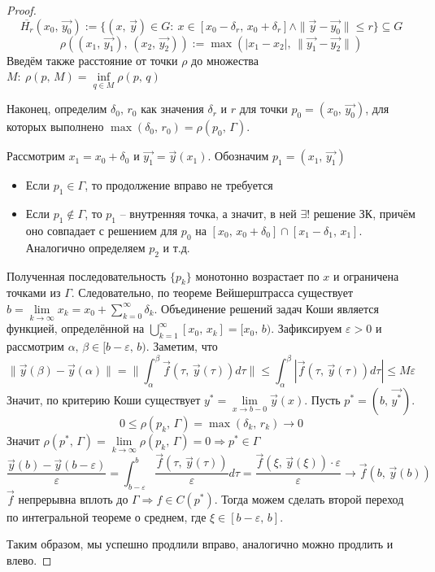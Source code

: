 \documentclass[a4paper,12pt]{article}
\renewcommand{\leq}{\ensuremath{\leqslant}}
\theoremstyle{plain}
\theoremstyle{definition}
\theoremstyle{remark}
\begin{document}
\begin{proof}
	\[\overline{H_r}(x_0,\, \vec{y_0}) := \{(x,\,\vec{y}) \in G:\: x \in [x_0 - \delta_r,\, x_0 + \delta_r] \land \|\vec{y} - \vec{y_0}\| \leq r\} \subseteq G\]
	\[\rho((x_1,\,\vec{y_1}),\, (x_2,\,\vec{y_2})) := \max(|x_1 - x_2|,\, \|\vec{y_1} - \vec{y_2}\|)\]
	Введём также расстояние от точки $\rho$ до множества $M:\: \rho(p,\, M) = \inf\limits_{q \in M} \rho(p,\,q)$

	Наконец, определим $\delta_0,\, r_0$ как значения $\delta_r$ и $r$ для точки $p_0 = (x_0,\,\vec{y_0})$, для которых выполнено $\max(\delta_0,\, r_0) = \rho(p_0,\, \Gamma)$.

	Рассмотрим $x_1 = x_0 + \delta_0$ и $\vec{y_1} = \vec{y}(x_1)$. Обозначим $p_1 = (x_1,\, \vec{y_1})$
	\begin{itemize}
		\item Если $p_1 \in \Gamma$, то продолжение вправо не требуется
		\item Если $p_1 \not\in \Gamma$, то $p_1$ -- внутренняя точка, а значит, в ней $\exists$! решение ЗК, причём оно совпадает с решением для $p_0$ на $[x_0,\, x_0 + \delta_0] \cap [x_1 - \delta_1,\, x_1]$. Аналогично определяем $p_2$ и т.д.
	\end{itemize}

	Полученная последовательность $\{p_k\}$ монотонно возрастает по $x$ и ограничена точками из $\Gamma$. Следовательно, по теореме Вейшерштрасса существует $b = \lim\limits_{k \to \infty} x_k = x_0 + \sum\limits_{k = 0}^\infty \delta_k$. Объединение решений задач Коши является функцией, определённой на $\bigcup\limits_{k = 1}^\infty [x_0,\,x_k] = [x_0,\, b)$. Зафиксируем $\varepsilon > 0$ и рассмотрим $\alpha,\, \beta \in [b - \varepsilon,\, b)$. Заметим, что
	\[\|\vec{y}(\beta) - \vec{y}(\alpha)\| = \|\int_\alpha^\beta \vec{f}(\tau,\, \vec{y}(\tau))d\tau\| \leq \int_\alpha^\beta |\vec{f}(\tau,\, \vec{y}(\tau))d\tau| \leq M\varepsilon\]
	Значит, по критерию Коши существует $y^* = \lim\limits_{x \to b - 0} \vec{y}(x)$. Пусть $p^* = (b,\, \vec{y^*})$.
	\[0 \leq \rho(p_k,\, \Gamma) = \max(\delta_k,\, r_k) \to 0\]
	Значит $\rho(p^*,\, \Gamma) = \lim\limits_{k \to \infty}\rho(p_k,\, \Gamma) = 0 \Rightarrow p^* \in \Gamma$
	\[\frac{\vec{y}(b) - \vec{y}(b - \varepsilon)}{\varepsilon} = \int_{b - \varepsilon}^b \frac{\vec{f}(\tau,\, \vec{y}(\tau))}{\varepsilon}d\tau = \frac{\vec{f}(\xi,\, \vec{y}(\xi)) \cdot \varepsilon}{\varepsilon} \to \vec{f}(b,\,\vec{y}(b))\]
	$\vec{f}$ непрерывна вплоть до $\Gamma \Rightarrow f \in C(p^*)$. Тогда можем сделать второй переход по интегральной теореме о среднем, где $\xi \in [b - \varepsilon,\, b]$.

	Таким образом, мы успешно продлили вправо, аналогично можно продлить и влево.
\end{proof}
\end{document}
